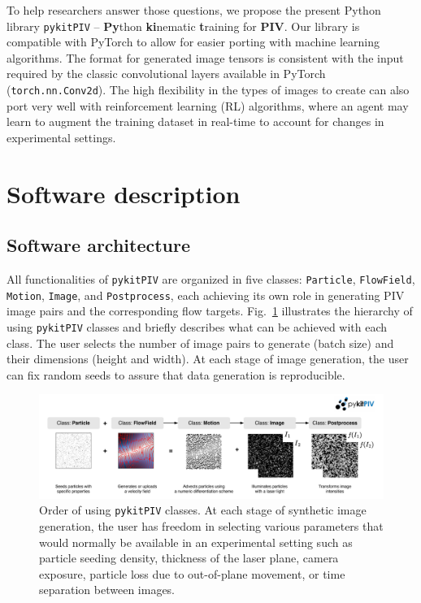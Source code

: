 \documentclass[a4paper,fleqn]{cas-dc}
\begin{document}
To help researchers answer those questions, we propose the present Python library \texttt{pykitPIV} -- \textbf{Py}thon \textbf{ki}nematic \textbf{t}raining for \textbf{PIV}. Our library is compatible with PyTorch \cite{paszke2017automatic, paszke2019pytorch} to allow for easier porting with machine learning algorithms. The format for generated image tensors is consistent with the input required by the classic convolutional layers available in PyTorch (\texttt{torch.nn.Conv2d}). The high flexibility in the types of images to create can also port very well with reinforcement learning (RL) algorithms, where an agent may learn to augment the training dataset in real-time to account for changes in experimental settings.


\section{Software description} \label{sec:software}

\subsection{Software architecture}

All functionalities of \texttt{pykitPIV} are organized in five classes: \texttt{Particle}, \texttt{FlowField}, \texttt{Motion}, \texttt{Image}, and \texttt{Postprocess}, each achieving its own role in generating PIV image pairs and the corresponding flow targets. Fig.~\ref{fig:pykitPIV-overview} illustrates the hierarchy of using \texttt{pykitPIV} classes and briefly describes what can be achieved with each class. The user selects the number of image pairs to generate (batch size) and their dimensions (height and width). At each stage of image generation, the user can fix random seeds to assure that data generation is reproducible.

\begin{figure}[t]
\centering
\vspace{-0.4 in}
\includegraphics[width=\textwidth]{pykitPIV-modules.pdf}
\vspace{10 pt}
\caption{\footnotesize Order of using \texttt{pykitPIV} classes. At each stage of synthetic image generation, the user has freedom in selecting various parameters that would normally be available in an experimental setting such as particle seeding density, thickness of the laser plane, camera exposure, particle loss due to out-of-plane movement, or time separation between images.}
\label{fig:pykitPIV-overview}
\end{figure}
\end{document}
